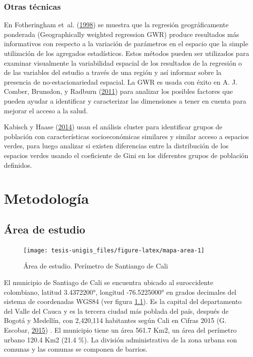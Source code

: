 \documentclass[12pt,a4paper,openany]{book}
\theoremstyle{definition}
\theoremstyle{definition}
\theoremstyle{definition}
\theoremstyle{remark}
\begin{document}
\subsection{Otras técnicas}\label{otras-tecnicas}

En Fotheringham et~al.
(\protect\hyperlink{ref-fotheringham_geographically_1998}{1998}) se
muestra que la regresión geográficamente ponderada (Geographically
weighted regression GWR) produce resultados más informativos con
respecto a la variación de parámetros en el espacio que la simple
utilización de los agregados estadísticos. Estos métodos pueden ser
utilizados para examinar visualmente la variabilidad espacial de los
resultados de la regresión o de las variables del estudio a través de
una región y así informar sobre la presencia de no-estacionariedad
espacial. La GWR es usada con éxito en A. J. Comber, Brunsdon, y Radburn
(\protect\hyperlink{ref-comber_spatial_2011}{2011}) para analizar los
posibles factores que pueden ayudar a identificar y caracterizar las
dimensiones a tener en cuenta para mejorar el acceso a la salud.

Kabisch y Haase (\protect\hyperlink{ref-kabisch_green_2014}{2014}) usan
el análisis cluster para identificar grupos de población con
características socioeconómicas similares y similar acceso a espacios
verdes, para luego analizar si existen diferencias entre la distribución
de los espacios verdes usando el coeficiente de Gini en los diferentes
grupos de población definidos.

\chapter{Metodología}\label{meto}

\section{Área de estudio}\label{area-de-estudio}

\begin{figure}

{\centering \texttt{[image: tesis-unigis\_files/figure-latex/mapa-area-1]} 

}

\caption{Área de estudio. Perímetro de Santiango de Cali}\label{fig:mapa-area}
\end{figure}

El municipio de Santiago de Cali se encuentra ubicado al suroccidente
colombiano, latitud 3.4372200°, longitud -76.5225000° en grados
decimales del sistema de coordenadas WGS84 (ver figura
\ref{fig:mapa-area}). Es la capital del departamento del Valle del Cauca
y es la tercera ciudad más poblada del país, después de Bogotá y
Medellín, con 2,420,114 habitantes según Cali en Cifras 2015 (G.
Escobar, \protect\hyperlink{ref-escobar2015cali}{2015}) . El municipio
tiene un área 561.7 Km2, un área del perímetro urbano 120.4 Km2 (21.4
\%). La división administrativa de la zona urbana son comunas y las
comunas se componen de barrios.
\end{document}
